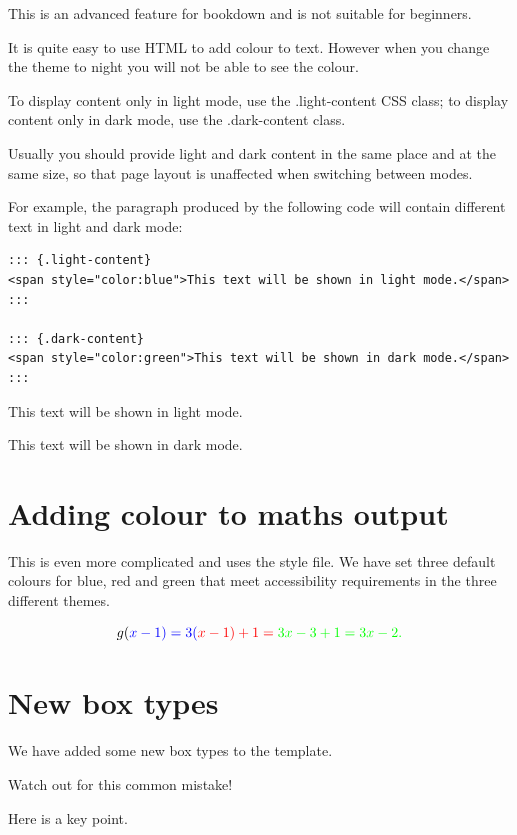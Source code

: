 \documentclass[
  letterpaper,
  oneside]{book}
\numberwithin{equation}{section}
\numberwithin{figure}{section}
\theoremstyle{break}
\theoremstyle{plain}
\theoremstyle{remark}
\begin{document}
This is an advanced feature for bookdown and is not suitable for
beginners.

It is quite easy to use HTML to add {colour to text.} However when you
change the theme to night you will not be able to see the colour.

To display content only in light mode, use the .light-content CSS class;
to display content only in dark mode, use the .dark-content class.

Usually you should provide light and dark content in the same place and
at the same size, so that page layout is unaffected when switching
between modes.

For example, the paragraph produced by the following code will contain
different text in light and dark mode:

\begin{verbatim}
::: {.light-content}
<span style="color:blue">This text will be shown in light mode.</span>
:::

::: {.dark-content}
<span style="color:green">This text will be shown in dark mode.</span>
:::
\end{verbatim}

{This text will be shown in light mode.}

{This text will be shown in dark mode.}

\section{Adding colour to maths
output}\label{adding-colour-to-maths-output}

This is even more complicated and uses the style file. We have set three
default colours for blue, red and green that meet accessibility
requirements in the three different themes.

\[
g(\color{blue}{x-1}) = 3(\color{red}{x-1}) + 1 = \color{green}{3x} - 3 + 1 = 3x-2.
\]

\section{New box types}\label{new-box-types}

We have added some new box types to the template.

Watch out for this common mistake!

Here is a key point.


\backmatter
\end{document}
